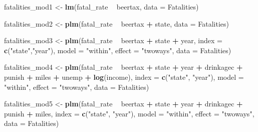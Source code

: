 \documentclass[]{book}
\newenvironment{Shaded}{\begin{snugshade}}{\end{snugshade}}
\newcommand{\KeywordTok}[1]{\textcolor[rgb]{0.13,0.29,0.53}{\textbf{#1}}}
\newcommand{\DataTypeTok}[1]{\textcolor[rgb]{0.13,0.29,0.53}{#1}}
\newcommand{\StringTok}[1]{\textcolor[rgb]{0.31,0.60,0.02}{#1}}
\newcommand{\OperatorTok}[1]{\textcolor[rgb]{0.81,0.36,0.00}{\textbf{#1}}}
\newcommand{\NormalTok}[1]{#1}
\theoremstyle{definition}
\theoremstyle{definition}
\theoremstyle{definition}
\theoremstyle{remark}
\begin{document}
\begin{Shaded}
\begin{Highlighting}[]
\NormalTok{fatalities_mod1 <-}\StringTok{ }\KeywordTok{lm}\NormalTok{(fatal_rate }\OperatorTok{~}\StringTok{ }\NormalTok{beertax, }\DataTypeTok{data =}\NormalTok{ Fatalities)}

\NormalTok{fatalities_mod2 <-}\StringTok{ }\KeywordTok{plm}\NormalTok{(fatal_rate }\OperatorTok{~}\StringTok{ }\NormalTok{beertax }\OperatorTok{+}\StringTok{ }\NormalTok{state, }\DataTypeTok{data =}\NormalTok{ Fatalities)}

\NormalTok{fatalities_mod3 <-}\StringTok{ }\KeywordTok{plm}\NormalTok{(fatal_rate }\OperatorTok{~}\StringTok{ }\NormalTok{beertax }\OperatorTok{+}\StringTok{ }\NormalTok{state }\OperatorTok{+}\StringTok{ }\NormalTok{year,}
                       \DataTypeTok{index =} \KeywordTok{c}\NormalTok{(}\StringTok{"state"}\NormalTok{,}\StringTok{"year"}\NormalTok{),}
                       \DataTypeTok{model =} \StringTok{"within"}\NormalTok{,}
                       \DataTypeTok{effect =} \StringTok{"twoways"}\NormalTok{, }
                       \DataTypeTok{data =}\NormalTok{ Fatalities)}

\NormalTok{fatalities_mod4 <-}\StringTok{ }\KeywordTok{plm}\NormalTok{(fatal_rate }\OperatorTok{~}\StringTok{ }\NormalTok{beertax }\OperatorTok{+}\StringTok{ }\NormalTok{state }\OperatorTok{+}\StringTok{ }\NormalTok{year }\OperatorTok{+}\StringTok{ }\NormalTok{drinkagec }
                       \OperatorTok{+}\StringTok{ }\NormalTok{punish }\OperatorTok{+}\StringTok{ }\NormalTok{miles }\OperatorTok{+}\StringTok{ }\NormalTok{unemp }\OperatorTok{+}\StringTok{ }\KeywordTok{log}\NormalTok{(income), }
                       \DataTypeTok{index =} \KeywordTok{c}\NormalTok{(}\StringTok{"state"}\NormalTok{, }\StringTok{"year"}\NormalTok{),}
                       \DataTypeTok{model =} \StringTok{"within"}\NormalTok{,}
                       \DataTypeTok{effect =} \StringTok{"twoways"}\NormalTok{,}
                       \DataTypeTok{data =}\NormalTok{ Fatalities)}

\NormalTok{fatalities_mod5 <-}\StringTok{ }\KeywordTok{plm}\NormalTok{(fatal_rate }\OperatorTok{~}\StringTok{ }\NormalTok{beertax }\OperatorTok{+}\StringTok{ }\NormalTok{state }\OperatorTok{+}\StringTok{ }\NormalTok{year }\OperatorTok{+}\StringTok{ }\NormalTok{drinkagec }
                       \OperatorTok{+}\StringTok{ }\NormalTok{punish }\OperatorTok{+}\StringTok{ }\NormalTok{miles,}
                       \DataTypeTok{index =} \KeywordTok{c}\NormalTok{(}\StringTok{"state"}\NormalTok{, }\StringTok{"year"}\NormalTok{),}
                       \DataTypeTok{model =} \StringTok{"within"}\NormalTok{,}
                       \DataTypeTok{effect =} \StringTok{"twoways"}\NormalTok{,}
                       \DataTypeTok{data =}\NormalTok{ Fatalities)}


\end{Highlighting}
\end{Shaded}
\end{document}
